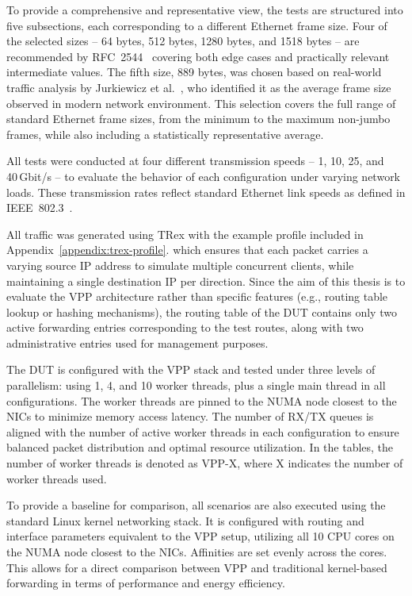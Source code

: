 To provide a comprehensive and representative view, the tests are structured into five subsections, each corresponding to a different Ethernet frame size. 
Four of the selected sizes -- 64 bytes, 512 bytes, 1280 bytes, and 1518 bytes -- are recommended by RFC~2544~\cite{rfc2544} 
covering both edge cases and practically relevant intermediate values. 
The fifth size, 889 bytes, was chosen based on real-world traffic analysis by Jurkiewicz et al.~\cite{JURKIEWICZ202115}, who identified it as the average frame size observed in modern network environment.
This selection covers the full range of standard Ethernet frame sizes, from the minimum to the maximum non-jumbo frames, 
while also including a statistically representative average.

All tests were conducted at four different transmission speeds -- 1, 10, 25, and 40 Gbit/s -- to evaluate the behavior of each configuration under varying network loads.  
These transmission rates reflect standard Ethernet link speeds as defined in IEEE~802.3~\cite{802.3}.

All traffic was generated using TRex with the example profile included in Appendix~\ref{appendix:trex-profile}.
which ensures that each packet carries a varying source IP address to simulate multiple concurrent clients, while maintaining a single destination IP per direction.
Since the aim of this thesis is to evaluate the VPP architecture rather than specific features (e.g., routing table lookup or hashing mechanisms),
the routing table of the DUT contains only two active forwarding entries corresponding to the test routes,
along with two administrative entries used for management purposes.

The DUT is configured with the VPP stack and tested under three levels of parallelism: using 1, 4, and 10 worker threads, plus a single main thread in all configurations.
The worker threads are pinned to the NUMA node closest to the NICs to minimize memory access latency.
The number of RX/TX queues is aligned with the number of active worker threads in each configuration to ensure balanced packet distribution and optimal resource utilization.
In the tables, the number of worker threads is denoted as VPP-X, where X indicates the number of worker threads used.

To provide a baseline for comparison, all scenarios are also executed using the standard Linux kernel networking stack.
It is configured with routing and interface parameters equivalent to the VPP setup, utilizing all 10 CPU cores on the NUMA node closest to the NICs.
Affinities are set evenly across the cores.
This allows for a direct comparison between VPP and traditional kernel-based forwarding in terms of performance and energy efficiency.

